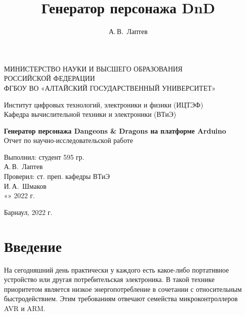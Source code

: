 \documentclass{altsu-report}
\title{Генератор персонажа DnD}
\author{А.\,В.~Лаптев}
\institute{Институт цифровых технологий, электроники и физики}
\date{\the\year}
\begin{document}
\begin{titlepage}
 \begin{center}
    \normalsize
    МИНИСТЕРСТВО НАУКИ И ВЫСШЕГО ОБРАЗОВАНИЯ \\
    РОССИЙСКОЙ ФЕДЕРАЦИИ \\
    ФГБОУ ВО «АЛТАЙСКИЙ ГОСУДАРСТВЕННЫЙ УНИВЕРСИТЕТ»
    \vfill
     
    Институт цифровых технологий, электроники и физики (ИЦТЭФ) \\
    Кафедра вычислительной техники и электроники (ВТиЭ)
    \vfill
     
    \textbf{Генератор персонажа Dangeons \& Dragons на платформе Arduino} \\
    Отчет по научно-исследовательской работе
 \end{center}
\vfill
 
\newlength{\ML}
\hfill\begin{minipage}{0.41\textwidth}
  Выполнил: студент 595 гр.\\
  \underline{\hspace{\ML}} А.\,В.~Лаптев \\
  Проверил: ст. преп. кафедры ВТиЭ\\
  \underline{\hspace{\ML}} И.\,А.~Шмаков \\
  «\underline{\hspace{1cm}}» \underline{\hspace{3cm}} 2022 г.
\end{minipage}%
\vfill
 
\begin{center}
  Барнаул, 2022 г.
\end{center}
\end{titlepage}

\setcounter{page}{2}
\makeabstract
\tableofcontents

\chapter*{Введение}

На сегодняшний день практически у каждого есть какое-либо портативное устройство или другая потребительская электроника. В такой технике приоритетом является низкое энергопотребление в сочетании с относительным быстродействием. Этим требованиям отвечают семейства микроконтроллеров AVR и ARM.
\end{document}
